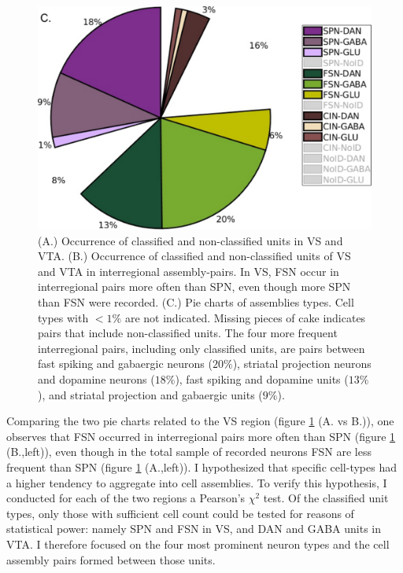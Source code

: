 \begin{figure}[H]
    \includegraphics[scale=0.45]{figures/PieAssembliesTot1.pdf}
    \caption{(A.) Occurrence of classified and non-classified units in VS and VTA. (B.) Occurrence of classified and non-classified units of VS and VTA in interregional assembly-pairs. In VS, FSN occur in interregional pairs more often than SPN, even though more SPN than FSN were recorded. (C.) Pie charts of assemblies types. Cell types with $<1\%$ are not indicated. Missing pieces of cake indicates pairs that include non-classified units. The four more frequent interregional pairs, including only classified units, are pairs between fast spiking and gabaergic neurons ($20\%$), striatal projection neurons and dopamine neurons ($18\%$), fast spiking and dopamine units ($13\%$), and striatal projection and gabaergic units ($9\%$). }
    \label{fig:PieAssembliesTot}
\end{figure}
Comparing the two pie charts related to the VS region (figure \ref{fig:PieAssembliesTot} (A. vs B.)), one observes that FSN occurred in interregional pairs more often than SPN (figure \ref{fig:PieAssembliesTot} (B.,left)), even though in the total sample of recorded neurons FSN are less frequent than SPN (figure \ref{fig:PieAssembliesTot} (A.,left)).
\label{sec:CellTypesOcc}
I hypothesized that specific cell-types had a higher tendency to aggregate into cell assemblies. To verify this hypothesis, I conducted for each of the two regions a Pearson's $\chi^2$ test. Of the classified unit types, only those with sufficient cell count could be tested for reasons of statistical power: namely SPN and FSN in VS, and DAN and GABA units in VTA. I therefore focused on the four most prominent neuron types and the cell assembly pairs formed between those units.
